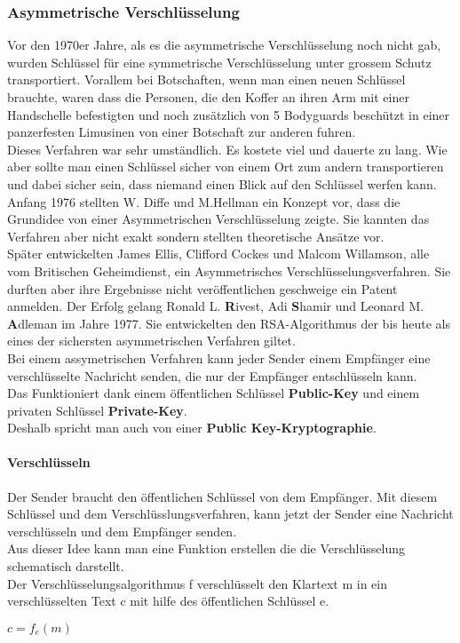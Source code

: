 \subsubsection{Asymmetrische Verschlüsselung}
Vor den 1970er Jahre, als es die asymmetrische Verschlüsselung noch nicht gab, wurden Schlüssel für eine symmetrische Verschlüsselung unter grossem Schutz transportiert.
Vorallem bei Botschaften, wenn man einen neuen Schlüssel brauchte, waren dass die Personen, die den Koffer an ihren Arm mit einer Handschelle befestigten und noch zusätzlich von 5 Bodyguards beschützt in einer panzerfesten Limusinen von einer Botschaft zur anderen fuhren.\\
Dieses Verfahren war sehr umständlich. Es kostete viel und dauerte zu lang. Wie aber sollte man einen Schlüssel sicher von einem Ort zum andern transportieren und dabei sicher sein, dass niemand einen Blick auf den Schlüssel werfen kann.\\
Anfang 1976 stellten W. Diffe und M.Hellman ein Konzept vor, dass die Grundidee von einer Asymmetrischen Verschlüsselung zeigte. Sie kannten das Verfahren aber nicht exakt sondern stellten theoretische Ansätze vor.\\ %
Später entwickelten James Ellis, Clifford Cockes und Malcom Willamson, alle vom Britischen Geheimdienst, ein Asymmetrisches Verschlüsselungsverfahren. Sie durften aber ihre Ergebnisse nicht veröffentlichen geschweige ein Patent anmelden. 
Der Erfolg gelang Ronald L. \textbf{R}ivest, Adi \textbf{S}hamir und Leonard M. \textbf{A}dleman im Jahre 1977. Sie entwickelten den RSA-Algorithmus der bis heute als eines der sichersten asymmetrischen Verfahren giltet.\\[2ex]
%
Bei einem assymetrischen Verfahren kann jeder Sender einem Empfänger eine verschlüsselte Nachricht senden, die nur der Empfänger entschlüsseln kann.\\
%
Das Funktioniert dank einem öffentlichen Schlüssel \textbf{Public-Key} und einem privaten Schlüssel \textbf{Private-Key}. \\
Deshalb spricht man auch von einer  \textbf{Public Key-Kryptographie}.
%
\paragraph{Verschlüsseln}
Der Sender braucht den öffentlichen Schlüssel von dem Empfänger. Mit diesem Schlüssel und dem Verschlüsslungsverfahren, kann jetzt der Sender eine Nachricht verschlüsseln und dem Empfänger senden.\\
Aus dieser Idee kann man eine Funktion erstellen die die Verschlüsselung schematisch darstellt.\\
Der Verschlüsselungsalgorithmus f verschlüsselt den Klartext m in ein verschlüsselten Text c mit hilfe des öffentlichen Schlüssel e.
 \begin{center}
 $ c = f_e (m) $
 \end{center}
